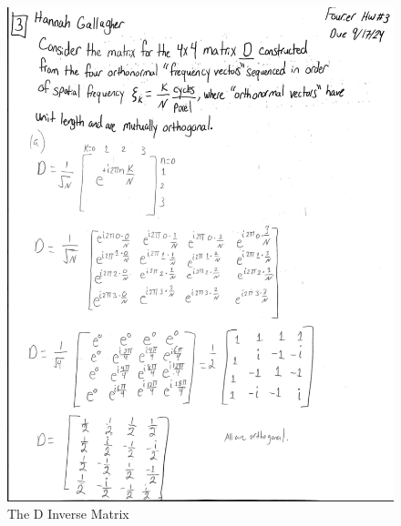 \documentclass{article}
\begin{document}
\begin{figure}[h!]
\centering
\includegraphics[scale=.65]{Fourier/Week 3/HW/DMatrixHW.png}
\caption{The D Inverse Matrix}
\label{fig:Notes3}
\end{figure}
\end{document}
